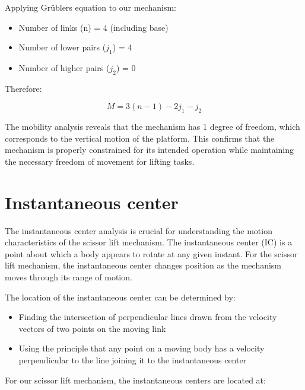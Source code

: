 \documentclass[../../main]{subfiles}
\begin{document}
Applying Grübler\textquotesingle s equation to our mechanism:

\begin{itemize}
\item
  Number of links (n) = 4 (including base)
\item
  Number of lower pairs ($j_1$) = 4
\item
  Number of higher pairs ($j_2$) = 0
\end{itemize}

Therefore:

\begin{equation}
  M = 3(n - 1) - 2j_1 - j_2
  \label{eq:grubler}
\end{equation}

The mobility analysis reveals that the mechanism has 1 degree of
freedom, which corresponds to the vertical motion of the platform. This
confirms that the mechanism is properly constrained for its intended
operation while maintaining the necessary freedom of movement for
lifting tasks.

\section{Instantaneous center}

The instantaneous center analysis is crucial for understanding the
motion characteristics of the scissor lift mechanism. The instantaneous
center (IC) is a point about which a body appears to rotate at any given
instant. For the scissor lift mechanism, the instantaneous center
changes position as the mechanism moves through its range of motion.

The location of the instantaneous center can be determined by:

\begin{itemize}
\item
  Finding the intersection of perpendicular lines drawn from the
  velocity vectors of two points on the moving link
\item
  Using the principle that any point on a moving body has a velocity
  perpendicular to the line joining it to the instantaneous center
\end{itemize}

For our scissor lift mechanism, the instantaneous centers are located
at:
\end{document}
